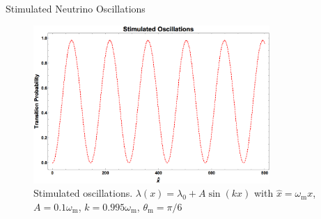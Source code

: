 \begin{frame}{Stimulated Neutrino Oscillations}
{\begin{figure}
\includegraphics[width=0.8\textwidth]{assets/stimulated-oscillation-phenomenon.png}
\caption*{Stimulated oscillations. $\lambda(x) = \lambda_0 +  A \sin (k x)$  with $\hat x = \omega_{\mathrm m} x $, $A=0.1\omega_{\mathrm m}$, $k=0.995\omega_{\mathrm m}$, $\theta_{\mathrm{m}}=\pi/6$}
\end{figure}


}





\end{frame}













